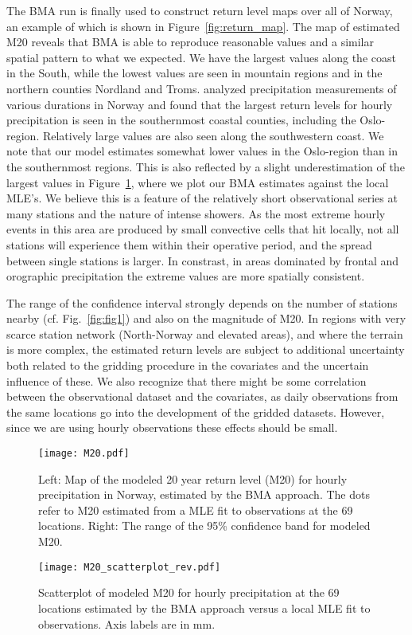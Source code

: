 \documentclass[11pt,english]{article}
\begin{document}
The BMA run is finally used to construct return level maps over all of Norway, an example of which is shown in Figure~\ref{fig:return_map}. The map of estimated M20 reveals that BMA is able to reproduce reasonable values and a similar spatial pattern to what we expected. We have the largest values along the coast in the South, while the lowest values are seen in mountain regions and in the northern counties Nordland and Troms. \cite{MamenandIden2010} analyzed precipitation measurements of various durations in Norway and found that the largest return levels for hourly precipitation is seen in the southernmost coastal counties, including the Oslo-region. Relatively large values are also seen along the southwestern coast. We note that our model estimates somewhat lower values in the Oslo-region than in the southernmost regions. This is also reflected by a slight underestimation of the largest values in Figure~\ref{fig:M20_scatter}, where we plot our BMA estimates against the local MLE's. We believe this is a feature of the relatively short observational series at many stations and the nature of intense showers. As the most extreme hourly events in this area are produced by small convective cells that hit locally, not all stations will experience them within their operative period, and the spread between single stations is larger. In constrast, in areas dominated by frontal and orographic precipitation the extreme values are more spatially consistent. 

The range of the confidence interval strongly depends on the number of stations nearby (cf. Fig.~\ref{fig:fig1}) and also on the magnitude of M20. In regions with very scarce station network (North-Norway and elevated areas), and where the terrain is more complex, the estimated return levels are subject to additional uncertainty both related to the gridding procedure in the covariates and the uncertain influence of these. We also recognize that there might be some correlation between the observational dataset and the covariates, as daily observations from the same locations go into the development of the gridded datasets. However, since we are using hourly observations these effects should be small.

\begin{figure}[htp]
\begin{center}
\texttt{[image: M20.pdf]} 
\caption[]{\label{fig:return_map}Left: Map of the modeled 20 year return level (M20) for hourly precipitation in Norway, estimated by the BMA approach. The dots refer to M20 estimated from a MLE fit to observations at the 69 locations. Right: The range of the 95\% confidence band for modeled M20.}
\texttt{[image: M20\_scatterplot\_rev.pdf]} 
\caption[]{\label{fig:M20_scatter}Scatterplot of modeled M20 for hourly precipitation at the 69 locations estimated by the BMA approach versus a local MLE fit to observations. Axis labels are in mm.}
\end{center}
\end{figure}
\end{document}
